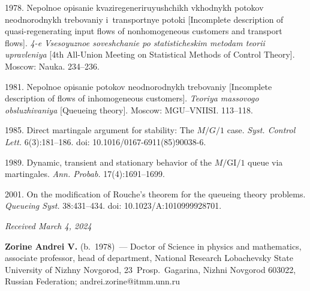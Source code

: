 \begin{multicols}{2}
{{\begin{thebibliography}{99}
 1978.
Nepolnoe opisanie kva\-zi\-re\-ge\-ne\-ri\-ru\-yushchikh vkhodnykh potokov neodnorodnykh trebovaniy i~transportnye potoki 
[Incomplete description of quasi-regenerating input flows of nonhomogeneous customers and transport flows].
\textit{4-e Vsesoyuznoe soveshchanie po statisticheskim metodam teorii upravleniya} 
[4th All-Union Meeting on Statistical Methods of Control Theory]. Moscow: Nauka. 234--236.


 1981. 
Nepolnoe opisanie potokov neodnorodnykh trebovaniy [Incomplete description of flows of inhomogeneous customers].
\textit{Teoriya  massovogo obsluzhivaniya} [Queueing theory].
Moscow: MGU--VNIISI. 113--118.

 1985.
Direct martingale argument for stability: The $M/G/1$ case. 
\textit{Syst. Control Lett.} 6(3):181--186.
doi: 10.1016/0167-6911(85)90038-6.

 1989.
Dynamic, transient and stationary behavior of the $M/\mathrm{GI}/1$ queue via martingales.
\textit{Ann. Probab.} 17(4):1691--1699.

 2001. 
On the modification of Rouche's theorem for the queueing theory problems. 
\textit{Queueing Syst.} 38:431--434.
doi: 10.1023/A:1010999928701.




\end{thebibliography}

 }
 }

\end{multicols}

\vspace*{-6pt}

\hfill{\small\textit{Received March 4, 2024}} 

\vspace*{-18pt}

\Contrl

\vspace*{-3pt}

\noindent 
\textbf{Zorine Andrei V.} (b.\ 1978)~--- Doctor of Science in physics and mathematics, associate professor, 
head of department,
National Research Lobachevsky State University of Nizhny Novgorod, 
23~Prosp.\ Gagarina, Nizhni Novgorod 603022, Russian Federation; \mbox{andrei.zorine@itmm.unn.ru}


\label{end\stat}

\renewcommand{\bibname}{\protect\rm Литература} 